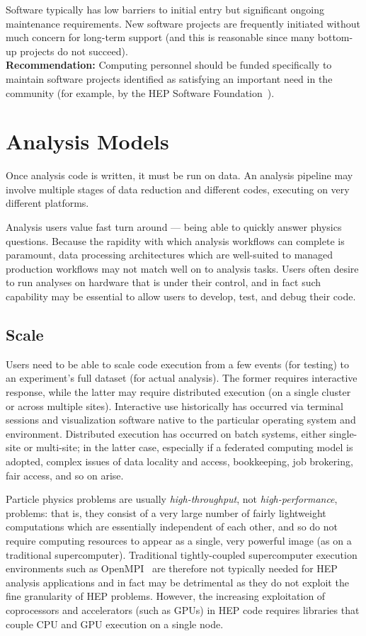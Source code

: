 Software typically has low barriers to initial entry but significant ongoing maintenance requirements. New software projects are frequently initiated without much concern for long-term support (and this is reasonable since many bottom-up projects do not succeed).\\
\textbf{Recommendation:} Computing personnel should be funded specifically to maintain software projects identified as satisfying an important need in the community (for example, by the HEP Software Foundation~\cite{HSF}). 


\section{Analysis Models}
Once analysis code is written, it must be run on data. An analysis pipeline may involve multiple stages of data reduction and different codes, executing on very different platforms.

Analysis users value fast turn around --- being able to quickly answer physics questions. Because the rapidity with which analysis workflows can complete is paramount, data processing architectures which are well-suited to managed production workflows may not match well on to analysis tasks. Users often desire to run analyses on hardware that is under their control, and in fact such capability may be essential to allow users to develop, test, and debug their code. 

\subsection{Scale}
Users need to be able to scale code execution from a few events (for testing) to an experiment's full dataset (for actual analysis). The former requires interactive response, while the latter may require distributed execution (on a single cluster or across multiple sites). Interactive use historically has occurred via terminal sessions and visualization software native to the particular operating system and environment. Distributed execution has occurred on batch systems, either single-site or multi-site; in the latter case, especially if a federated computing model is adopted, complex issues of data locality and access, bookkeeping, job brokering, fair access, and so on arise.

Particle physics problems are usually \textit{high-throughput}, not \textit{high-performance}, problems: that is, they consist of a very large number of fairly lightweight computations which are essentially independent of each other, and so do not require computing resources to appear as a single, very powerful image (as on a traditional supercomputer). Traditional tightly-coupled supercomputer execution environments such as OpenMPI~\cite{gabriel04:_open_mpi} are therefore not typically needed for HEP analysis applications and in fact may be detrimental as they do not exploit the fine granularity of HEP problems. However, the increasing exploitation of coprocessors and accelerators (such as GPUs) in HEP code requires libraries that couple CPU and GPU execution on a single node.

